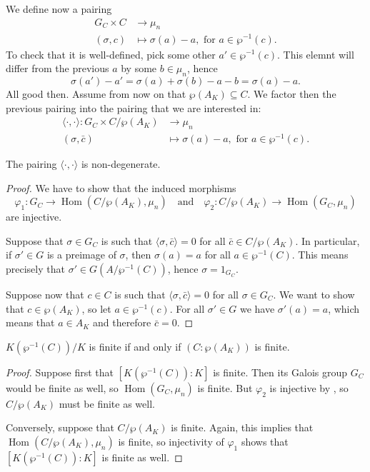 \documentclass[12pt]{amsart}
\DeclareMathOperator{\Hom}{Hom}
\begin{document}
We define now a pairing
\begin{align*}
    G_{C}\times C &\longrightarrow \mu_{n} \\
    (\sigma,c) &\longmapsto \sigma(a)-a, \text{ for }a\in \wp^{-1}(c).
\end{align*}
To check that it is well-defined, pick some other $a'\in \wp^{-1}(c)$.
This elemnt will differ from the previous $a$ by some $b\in \mu_{n}$, hence
\[ \sigma(a')-a'=\sigma(a)+\sigma(b)-a-b=\sigma(a)-a. \]
All good then.
Assume from now on that $\wp(A_{K})\subseteq C$.
We factor then the previous pairing into the pairing that we are interested in:
\begin{align*}
    \langle \cdot,\cdot\rangle \colon G_{C}\times C/\wp(A_{K}) &\longrightarrow \mu_{n} \\
    (\sigma,\bar{c}) & \longmapsto \sigma(a)-a, \text{ for }a\in \wp^{-1}(c).
\end{align*}

\begin{lm}\label{lm:injectivity}
    The pairing $\langle \cdot,\cdot\rangle$ is non-degenerate.
    \begin{proof}
	We have to show that the induced morphisms
	\[ \varphi_{1}\colon G_{C}\to \Hom(C/\wp(A_{K}),\mu_{n}) \quad\text{and}\quad \varphi_{2}\colon C/\wp(A_{K})\to \Hom(G_{C},\mu_{n}) \]
	are injective.

	Suppose that $\sigma\in G_{C}$ is such that $\langle \sigma,\bar{c}\rangle=0$ for all $\bar{c}\in C/\wp(A_{K})$.
	In particular, if $\sigma'\in G$ is a preimage of $\sigma$, then $\sigma(a)=a$ for all $a\in \wp^{-1}(C)$.
	This means precisely that $\sigma'\in G(A/\wp^{-1}(C))$, hence $\sigma=1_{G_{C}}$.

	Suppose now that $c\in C$ is such that $\langle \sigma, \bar{c}\rangle=0$ for all $\sigma\in G_{C}$.
	We want to show that $c\in \wp(A_{K})$, so let $a\in \wp^{-1}(c)$.
	For all $\sigma'\in G$ we have $\sigma'(a)=a$, which means that $a\in A_{K}$ and therefore $\bar{c}=0$.
    \end{proof}
\end{lm}

\begin{lm}\label{lm:finiteness}
    $K(\wp^{-1}(C))/K$ is finite if and only if $(C:\wp(A_{K}))$ is finite.
    \begin{proof}
	Suppose first that $[K(\wp^{-1}(C)):K]$ is finite.
	Then its Galois group $G_{C}$ would be finite as well, so $\Hom(G_{C},\mu_{n})$ is finite.
	But $\varphi_{2}$ is injective by , so $C/\wp(A_{K})$ must be finite as well.

	Conversely, suppose that $C/\wp(A_{K})$ is finite.
	Again, this implies that $\Hom(C/\wp(A_{K}),\mu_{n})$ is finite, so injectivity of $\varphi_{1}$ shows that $[K(\wp^{-1}(C)):K]$ is finite as well.
    \end{proof}
\end{lm}

\newpage


\vfill
\end{document}
